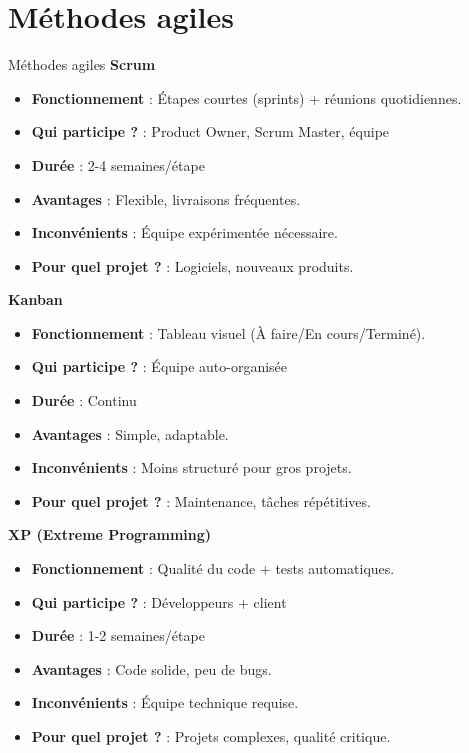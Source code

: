 \documentclass{beamer}
\begin{document}
\section{Méthodes agiles}
\begin{frame}{Méthodes agiles}
  \scriptsize
  \textbf{Scrum}
  \begin{itemize}
    \item \textbf{Fonctionnement} : Étapes courtes (sprints) + réunions quotidiennes.
    \item \textbf{Qui participe ?} : Product Owner, Scrum Master, équipe
    \item \textbf{Durée} : 2-4 semaines/étape
    \item \textbf{Avantages} : Flexible, livraisons fréquentes.
    \item \textbf{Inconvénients} : Équipe expérimentée nécessaire.
    \item \textbf{Pour quel projet ?} : Logiciels, nouveaux produits.
  \end{itemize}
  \vspace{0.3cm}
  \textbf{Kanban}
  \begin{itemize}
    \item \textbf{Fonctionnement} : Tableau visuel (À faire/En cours/Terminé).
    \item \textbf{Qui participe ?} : Équipe auto-organisée
    \item \textbf{Durée} : Continu
    \item \textbf{Avantages} : Simple, adaptable.
    \item \textbf{Inconvénients} : Moins structuré pour gros projets.
    \item \textbf{Pour quel projet ?} : Maintenance, tâches répétitives.
  \end{itemize}
  \vspace{0.3cm}
  \textbf{XP (Extreme Programming)}
  \begin{itemize}
    \item \textbf{Fonctionnement} : Qualité du code + tests automatiques.
    \item \textbf{Qui participe ?} : Développeurs + client
    \item \textbf{Durée} : 1-2 semaines/étape
    \item \textbf{Avantages} : Code solide, peu de bugs.
    \item \textbf{Inconvénients} : Équipe technique requise.
    \item \textbf{Pour quel projet ?} : Projets complexes, qualité critique.
  \end{itemize}
\end{frame}
\end{document}
